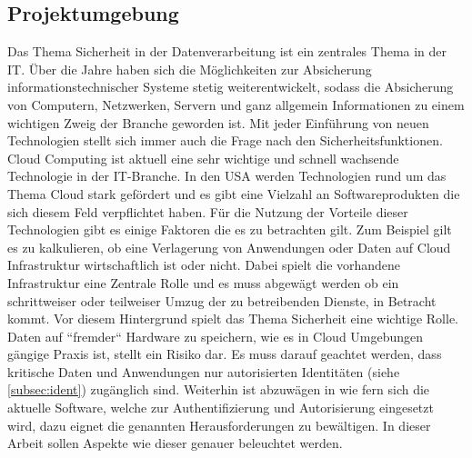\documentclass[
book,
a4paper,   
titlepage,  
halfparskip,
12pt        
]{scrartcl}
\begin{document}
\begin{onehalfspacing}
\subsection{Projektumgebung}
\label{subsec:proj}
Das Thema Sicherheit in der Datenverarbeitung ist ein zentrales Thema in der \ac{IT}. Über die Jahre haben sich die Möglichkeiten zur Absicherung informationstechnischer Systeme stetig weiterentwickelt, sodass die Absicherung von Computern, Netzwerken, Servern und ganz allgemein Informationen zu einem wichtigen Zweig der Branche geworden ist. Mit jeder Einführung von neuen Technologien stellt sich immer auch die Frage nach den Sicherheitsfunktionen.\\
Cloud Computing ist aktuell eine sehr wichtige und schnell wachsende Technologie in der \ac{IT}-Branche. In den \ac{USA} werden Technologien rund um das Thema Cloud stark gefördert und es gibt eine Vielzahl an Softwareprodukten die sich diesem Feld verpflichtet haben. Für die Nutzung der Vorteile dieser Technologien gibt es einige Faktoren die es zu betrachten gilt. Zum Beispiel gilt es zu kalkulieren, ob eine Verlagerung von Anwendungen oder Daten auf Cloud Infrastruktur wirtschaftlich ist oder nicht. Dabei spielt die vorhandene Infrastruktur eine Zentrale Rolle und es muss abgewägt werden ob ein schrittweiser oder teilweiser Umzug der zu betreibenden Dienste, in Betracht kommt. Vor diesem Hintergrund spielt das Thema Sicherheit eine wichtige Rolle. Daten auf ``fremder`` Hardware zu speichern, wie es in Cloud Umgebungen gängige Praxis ist, stellt ein Risiko dar. Es muss darauf geachtet werden, dass kritische Daten und Anwendungen nur autorisierten Identitäten (siehe \vref{subsec:ident}) zugänglich sind. Weiterhin ist abzuwägen in wie fern sich die aktuelle Software, welche zur Authentifizierung und Autorisierung eingesetzt wird, dazu eignet die genannten Herausforderungen zu bewältigen. In dieser Arbeit sollen Aspekte wie dieser genauer beleuchtet werden.


\end{onehalfspacing}
\end{document}
